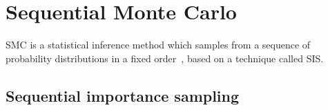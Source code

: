 %
%
%




\section{Sequential Monte Carlo}
\label{sec:smc}

\Gls{SMC} is a statistical inference method which samples from a sequence of
probability distributions in a fixed order~\autocite{del2006sequential}, based
on a technique called \gls{SIS}.

\subsection{Sequential importance sampling}
\label{subsec:sis}

